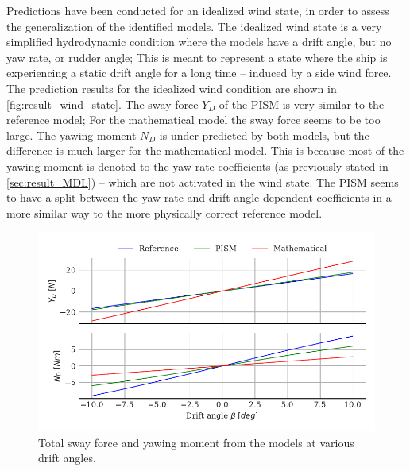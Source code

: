 Predictions have been conducted for an idealized wind state, in order to assess the generalization of the  identified models. The idealized wind state is a very simplified hydrodynamic condition where the models have a drift angle, but no yaw rate, or rudder angle; This is meant to represent a state where the ship is experiencing a static drift angle for a long time -- induced by a side wind force.
The prediction results for the idealized wind condition are shown in \autoref{fig:result_wind_state}. The sway force $Y_D$ of the PISM is very similar to the reference model; For the mathematical model the sway force seems to be too large. The yawing moment $N_D$ is under predicted by both models, but the difference is much larger for the mathematical model. 
This is because most of the yawing moment is denoted to the yaw rate coefficients (as previously stated in \autoref{sec:result_MDL}) -- which are not activated in the wind state. 
The PISM seems to have a split between the yaw rate and drift angle dependent coefficients in a more similar way to the more physically correct reference model.
\label{sec:wind_state}
\begin{figure}[h!]
    \includegraphics[width=\columnwidth]{figures/result_wind_state.forces.pdf}
    \caption{Total sway force and yawing moment from the models at various drift angles.}
    \label{fig:result_wind_state}
\end{figure}